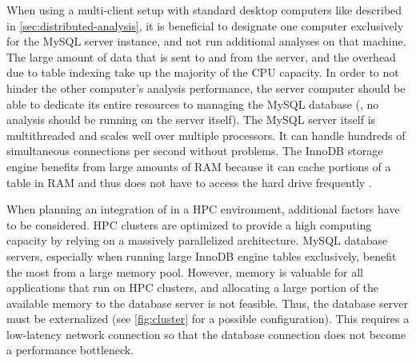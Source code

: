 \label{sec:distributed-analysis-discussion}
When using a multi-client setup with standard desktop computers like described
in \autoref{sec:distributed-analysis}, it is beneficial to designate one
computer exclusively for the MySQL server instance, and not run additional
\pname analyses on that machine. The large amount of data that is sent to and
from the server, and the overhead due to table indexing take up the majority of
the CPU capacity. In order to not hinder the other computer's analysis
performance, the server computer should be able to dedicate its entire resources
to managing the MySQL database (\ie, no \pname analysis should be running on the
server itself). The MySQL server itself is multithreaded and scales well over
multiple processors. It can handle hundreds of simultaneous connections per
second without problems. The InnoDB storage engine benefits from large amounts
of RAM because it can cache portions of a table in RAM and thus does not have to
access the hard drive frequently \citep{schneider2005}.

When planning an integration of \pname in a HPC environment, additional factors
have to be considered. HPC clusters are optimized to provide a high computing
capacity by relying on a massively parallelized architecture. MySQL database
servers, especially when running large InnoDB engine tables exclusively, benefit
the most from a large memory pool. However, memory is valuable for all
applications that run on HPC clusters, and allocating a large portion of the
available memory to the database server is not feasible. Thus, the database
server must be externalized (see \autoref{fig:cluster} for a possible
configuration). This requires a low-latency network connection so that the
database connection does not become a performance bottleneck.


